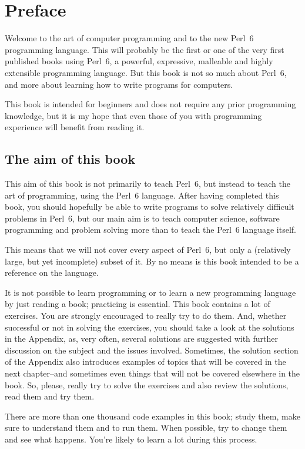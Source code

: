 
\chapter{Preface}

Welcome to the art of computer programming and to the 
new Perl~6 programming language. This will probably be 
the first or one of the very first published books using Perl~6, 
a powerful, expressive, malleable and highly extensible 
programming language. But this book is not so much 
about Perl~6, and more about learning 
how to write programs for computers. 

This book is intended for beginners and does not require 
any prior programming knowledge, but it is my hope 
that even those of you with programming experience will 
benefit from reading it.

\section*{The aim of this book}

This aim of this book is not primarily to teach Perl~6, 
but instead to teach the art 
of programming, using the Perl~6 language. After having 
completed this book, you should hopefully be able 
to write programs to solve relatively difficult problems in 
Perl~6, but our main aim is to teach computer science, software 
programming and problem solving more than to teach the Perl~6 
language itself. 

This means that we will not cover every aspect of Perl~6, but 
only a (relatively large, but yet incomplete) subset of it. 
By no means is this book intended to be a reference on the 
language.

It is not possible to learn programming or to learn a new 
programming language by just reading a book; practicing 
is essential. This book contains a lot of exercises. You 
are strongly encouraged to really try to do them. And, 
whether successful or not in solving the exercises, you 
should take a look at the solutions in the Appendix, 
as, very often, several solutions are suggested with further 
discussion on the subject and the issues involved. Sometimes, the solution 
section of the Appendix also introduces examples of topics 
that will be covered in the next chapter--and sometimes even 
things that will not be covered elsewhere in the book. So, 
please, really try to solve the exercises and also review 
the solutions, read them and try them. 

There are more than one thousand code examples in this book; 
study them, make sure to understand them and to run them. When 
possible, try to change them and see what happens. You're 
likely to learn a lot during this process.


